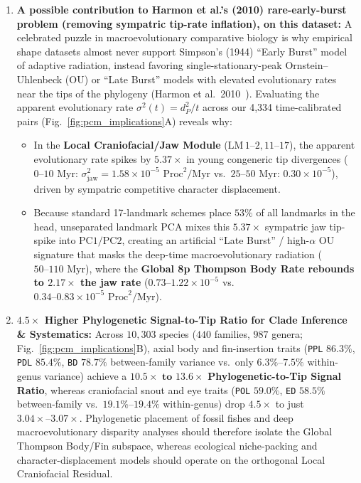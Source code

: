 \documentclass[11pt,a4paper]{article}
\theoremstyle{definition}
\theoremstyle{remark}
\begin{document}
\begin{enumerate}
  \item \textbf{A possible contribution to Harmon et al.'s (2010) rare-early-burst problem (removing sympatric tip-rate inflation), on this dataset:}
  A celebrated puzzle in macroevolutionary comparative biology is why empirical shape datasets almost never support Simpson's (1944) ``Early Burst'' model of adaptive radiation, instead favoring single-stationary-peak Ornstein--Uhlenbeck (OU) or ``Late Burst'' models with elevated evolutionary rates near the tips of the phylogeny (Harmon et al.\ 2010~\cite{Harmon2010}). Evaluating the apparent evolutionary rate $\sigma^2(t) = d_P^2 / t$ across our 4,334 time-calibrated pairs (Fig.~\ref{fig:pcm_implications}A) reveals why:
  \begin{itemize}
    \item In the \textbf{Local Craniofacial/Jaw Module} ($\mathrm{LM}\,1\text{--}2, 11\text{--}17$), the apparent evolutionary rate spikes by $\mathbf{5.37\times}$ in young congeneric tip divergences ($0\text{--}10\text{ Myr}$: $\sigma^2_{\mathrm{jaw}} = 1.58 \times 10^{-5}\text{ Proc}^2/\text{Myr}$ vs.\ $25\text{--}50\text{ Myr}$: $0.30 \times 10^{-5}$), driven by sympatric competitive character displacement.
    \item Because standard 17-landmark schemes place $53\%$ of all landmarks in the head, unseparated landmark PCA mixes this $5.37\times$ sympatric jaw tip-spike into $\mathrm{PC1}/\mathrm{PC2}$, creating an artificial ``Late Burst'' / high-$\alpha$ OU signature that masks the deep-time macroevolutionary radiation ($50\text{--}110\text{ Myr}$), where the \textbf{Global 8p Thompson Body Rate rebounds to $2.17\times$ the jaw rate} ($0.73\text{--}1.22 \times 10^{-5}$ vs.\ $0.34\text{--}0.83 \times 10^{-5}\text{ Proc}^2/\text{Myr}$).
  \end{itemize}

  \item \textbf{$4.5\times$ Higher Phylogenetic Signal-to-Tip Ratio for Clade Inference \& Systematics:}
  Across $10{,}303$ species ($440$ families, $987$ genera; Fig.~\ref{fig:pcm_implications}B), axial body and fin-insertion traits (\texttt{PPL} $86.3\%$, \texttt{PDL} $85.4\%$, \texttt{BD} $78.7\%$ between-family variance vs.\ only $6.3\%\text{--}7.5\%$ within-genus variance) achieve a $\mathbf{10.5\times\text{ to }13.6\times}$ \textbf{Phylogenetic-to-Tip Signal Ratio}, whereas craniofacial snout and eye traits (\texttt{POL} $59.0\%$, \texttt{ED} $58.5\%$ between-family vs.\ $19.1\%\text{--}19.4\%$ within-genus) drop $\mathbf{4.5\times}$ to just $3.04\times\text{--}3.07\times$. Phylogenetic placement of fossil fishes and deep macroevolutionary disparity analyses should therefore isolate the Global Thompson Body/Fin subspace, whereas ecological niche-packing and character-displacement models should operate on the orthogonal Local Craniofacial Residual.


\end{enumerate}
\end{document}
